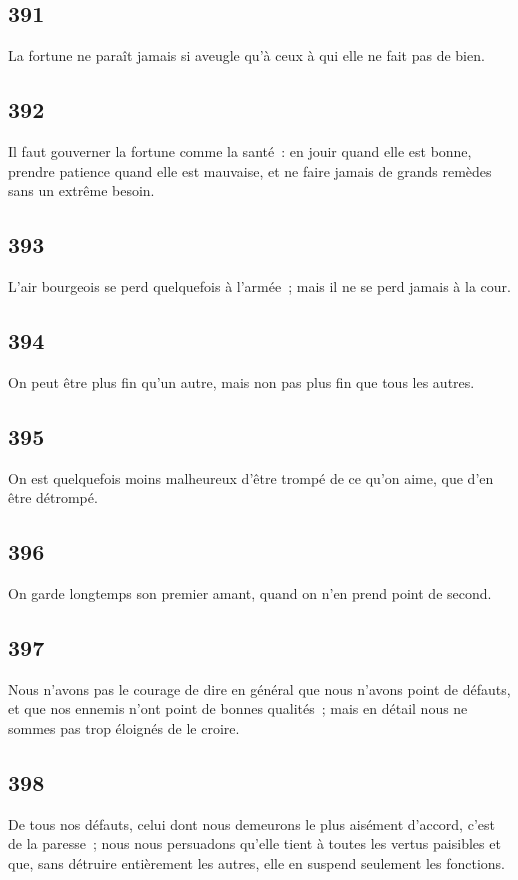 \documentclass[french,twoside]{book} %
\begin{document}
\subsection[{391}]{ \textsc{391} }
\noindent La fortune ne paraît jamais si aveugle qu’à ceux à qui elle ne fait pas de bien.
\subsection[{392}]{ \textsc{392} }
\noindent Il faut gouverner la fortune comme la santé : en jouir quand elle est bonne, prendre patience quand elle est mauvaise, et ne faire jamais de grands remèdes sans un extrême besoin.
\subsection[{393}]{ \textsc{393} }
\noindent L’air bourgeois se perd quelquefois à l’armée ; mais il ne se perd jamais à la cour.
\subsection[{394}]{ \textsc{394} }
\noindent On peut être plus fin qu’un autre, mais non pas plus fin que tous les autres.
\subsection[{395}]{ \textsc{395} }
\noindent On est quelquefois moins malheureux d’être trompé de ce qu’on aime, que d’en être détrompé.
\subsection[{396}]{ \textsc{396} }
\noindent On garde longtemps son premier amant, quand on n’en prend point de second.
\subsection[{397}]{ \textsc{397} }
\noindent Nous n’avons pas le courage de dire en général que nous n’avons point de défauts, et que nos ennemis n’ont point de bonnes qualités ; mais en détail nous ne sommes pas trop éloignés de le croire.
\subsection[{398}]{ \textsc{398} }
\noindent De tous nos défauts, celui dont nous demeurons le plus aisément d’accord, c’est de la paresse ; nous nous persuadons qu’elle tient à toutes les vertus paisibles et que, sans détruire entièrement les autres, elle en suspend seulement les fonctions.
\end{document}
